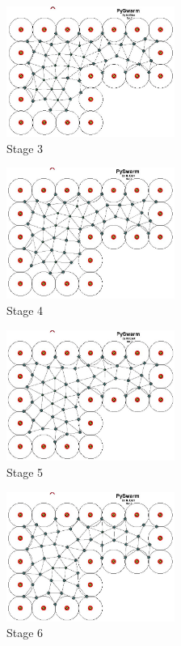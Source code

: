 \documentclass[10pt,journal,letterpaper,twoside]{IEEEtran}
\begin{document}
\begin{figure}
\begin{center}
\includegraphics[width=5.5cm]{figures/REPEL52-3}
\end{center}
\caption{Stage 3\label{emerge:Repel52-3}}
\end{figure}

\begin{figure}
\begin{center}
\includegraphics[width=5.5cm]{figures/REPEL52-4}
\end{center}
\caption{Stage 4\label{emerge:Repel52-4}}
\end{figure}

\begin{figure}
\begin{center}
\includegraphics[width=5.5cm]{figures/REPEL52-5}
\end{center}
\caption{Stage 5\label{emerge:Repel52-5}}
\end{figure}

\begin{figure}
\begin{center}
\includegraphics[width=5.5cm]{figures/REPEL52-6}
\end{center}
\caption{Stage 6\label{emerge:Repel52-6}}
\end{figure}
\end{document}
